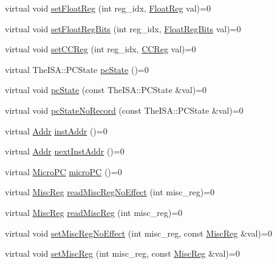 \begin{DoxyCompactItemize}
\item 
virtual void \hyperlink{classThreadContext_af8dc9762fda519d911372dd6f4a28d8e}{setFloatReg} (int reg\_\-idx, \hyperlink{classThreadContext_a75484259f1855aabc8d74c6eb1cfe186}{FloatReg} val)=0
\item 
virtual void \hyperlink{classThreadContext_a8f0c8b07cd1c4a6019a5b3922689d1db}{setFloatRegBits} (int reg\_\-idx, \hyperlink{classThreadContext_aab5eeae86499f9bfe15ef79360eccc64}{FloatRegBits} val)=0
\item 
virtual void \hyperlink{classThreadContext_a276736f0c1f99f27ed95348979e8b8c6}{setCCReg} (int reg\_\-idx, \hyperlink{classThreadContext_a0c9de550a32808e6a25b54b6c791d5ab}{CCReg} val)=0
\item 
virtual TheISA::PCState \hyperlink{classThreadContext_a1aaca26c0732d2191edbde1477d7ec13}{pcState} ()=0
\item 
virtual void \hyperlink{classThreadContext_a8f9949be84d3a2db4137f9e49ce32952}{pcState} (const TheISA::PCState \&val)=0
\item 
virtual void \hyperlink{classThreadContext_aaeee41ee07ac94c41a94512f28a431fa}{pcStateNoRecord} (const TheISA::PCState \&val)=0
\item 
virtual \hyperlink{base_2types_8hh_af1bb03d6a4ee096394a6749f0a169232}{Addr} \hyperlink{classThreadContext_a899644592f5027a7951cfd87b1c548a2}{instAddr} ()=0
\item 
virtual \hyperlink{base_2types_8hh_af1bb03d6a4ee096394a6749f0a169232}{Addr} \hyperlink{classThreadContext_a01377ccfda419abf5f6ff7730c9eaac9}{nextInstAddr} ()=0
\item 
virtual \hyperlink{base_2types_8hh_adfb4d8b20c5abc8be73dd367b16f2d57}{MicroPC} \hyperlink{classThreadContext_a263dbcf93ece0a30ea54a77fdb2e3926}{microPC} ()=0
\item 
virtual \hyperlink{classThreadContext_aaf5f073a387db0556d1db4bcc45428bc}{MiscReg} \hyperlink{classThreadContext_a93c9c97261cb7289d5976b8222f70c4c}{readMiscRegNoEffect} (int misc\_\-reg)=0
\item 
virtual \hyperlink{classThreadContext_aaf5f073a387db0556d1db4bcc45428bc}{MiscReg} \hyperlink{classThreadContext_a6888f4bff21e34892e59654ea80073b2}{readMiscReg} (int misc\_\-reg)=0
\item 
virtual void \hyperlink{classThreadContext_a2987c1ff22ebdf6cdf354a31462bdbfb}{setMiscRegNoEffect} (int misc\_\-reg, const \hyperlink{classThreadContext_aaf5f073a387db0556d1db4bcc45428bc}{MiscReg} \&val)=0
\item 
virtual void \hyperlink{classThreadContext_a074166dc2fe3c4aea3ad588ed9883c51}{setMiscReg} (int misc\_\-reg, const \hyperlink{classThreadContext_aaf5f073a387db0556d1db4bcc45428bc}{MiscReg} \&val)=0

\end{DoxyCompactItemize}
